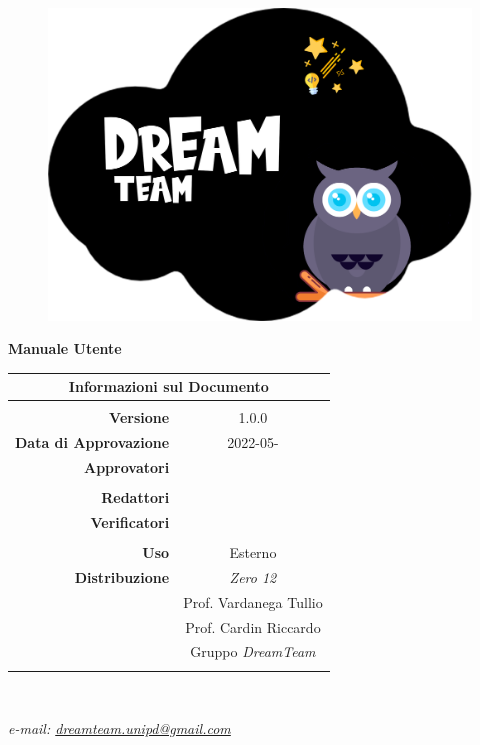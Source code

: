 
\begin{center}
\begin{figure}
\centering
\includegraphics[scale=0.05]{./images/DreamTeam.png} 
\end{figure}

{\Huge{\textbf{Manuale Utente}}} \\ [1cm]

\begin{table}[htbp]
\centering
\begin{tabular}{r|c}
\multicolumn{2}{c}{\textbf{Informazioni sul Documento}} \\
\hline \\
\textbf{Versione} & 1.0.0 \\ \rule{0pt}{3ex}   
\textbf{Data di Approvazione} & 2022-05- \\ \rule{0pt}{3ex}    
\textbf{Approvatori} &  \\ \rule{0pt}{2ex}   
& \\ \rule{0pt}{3ex}  
\textbf{Redattori} & \GC{} \\ \rule{0pt}{3ex}    
\textbf{Verificatori} & \PV{} \\ \rule{0pt}{2ex}     
&  \\ \rule{0pt}{3ex}      
\textbf{Uso} & Esterno \\ \rule{0pt}{3ex}    
\textbf{Distribuzione} & \textit{Zero 12} \\ \rule{0pt}{2ex} 
& Prof. Vardanega Tullio \\ \rule{0pt}{2ex}   
& Prof. Cardin Riccardo \\ \rule{0pt}{2ex}   
& Gruppo \textit{DreamTeam} \\ \rule{0pt}{0.1cm}   
\end{tabular} \\ [0.5cm]
\end{table}

\textsl{ e-mail: \href{mailto:dreamteam.unipd@gmail.com}{dreamteam.unipd@gmail.com} } \\[2cm]
\end{center}
\pagebreak